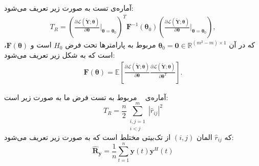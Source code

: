 آماره‌ی تست  به صورت زیر تعریف می‌شود:
\begin{align}
	T_R 
	= \left(
	\frac{\partial\mathcal{L}(\tilde{\mathbf{Y}};\boldsymbol{\theta})}{\partial\boldsymbol{\theta}}
	\Big|_{\boldsymbol{\theta}=\boldsymbol{\theta}_0}
	\right)^T
	\mathbf{F}^{-1}(\boldsymbol{\theta}_0)
	\left(
	\frac{\partial\mathcal{L}(\tilde{\mathbf{Y}};\boldsymbol{\theta})}{\partial\boldsymbol{\theta}}
	\Big|_{\boldsymbol{\theta}=\boldsymbol{\theta}_0}
	\right),
\end{align}
که در آن
$\boldsymbol{\theta}_0=\mathbf{0}\in\mathbb{R}^{(m^2-m)\times1}$
مربوط به پارامترها تحت فرض
$H_0$
است و
$\mathbf{F}(\boldsymbol{\theta})$،
 است که به شکل زیر تعریف می‌شود:
\begin{align}
	\mathbf{F}(\boldsymbol{\theta})
	= \mathbb{E}\!\left[
	\frac{\partial\mathcal{L}(\tilde{\mathbf{Y}};\boldsymbol{\theta})}{\partial\boldsymbol{\theta}}
	\frac{\partial\mathcal{L}(\tilde{\mathbf{Y}};\boldsymbol{\theta})}{\partial\boldsymbol{\theta}^T}
	\right].
\end{align}
\begin{قضیه}
	آماره‌ی \  مربوط به تست فرض ما به صورت زیر است:
	\begin{equation}
		T_R=\frac{n}{2}\sum_{\substack{i,j=1\\i<j}}^{m} \left|\hat{r}_{ij}\right|^2
	\end{equation}
	که 
	$\hat{r}_{ij}$
	المان 
	$(i,j)$
	از  تک‌بیتی مختلط است که به صورت زیر تعریف می‌شود:
	\begin{equation}
		\hat{\mathbf{R}}_\mathbf{y}=\frac{1}{n}\sum_{t=1}^{n} \mathbf{y}(t)\mathbf{y}^H(t) \label{eq:SCMRy}
	\end{equation}
\end{قضیه}
